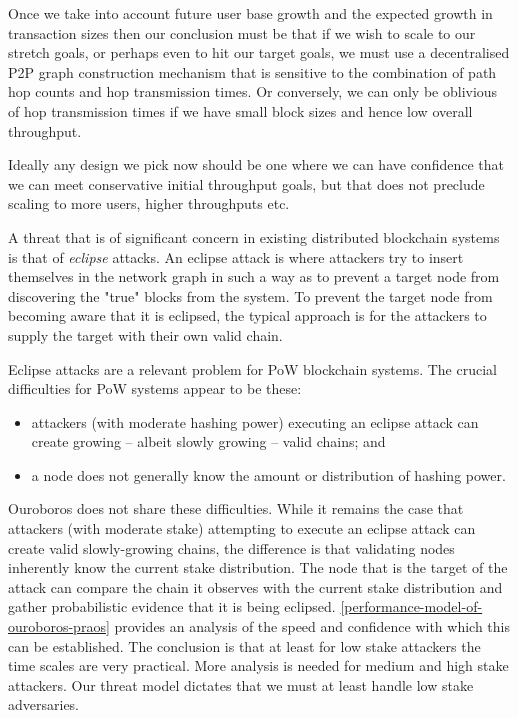 \documentclass[11pt,a4paper]{article}
\begin{document}
Once we take into account future user base growth and the expected
growth in transaction sizes then our conclusion must be that if we wish
to scale to our stretch goals, or perhaps even to hit our target goals,
we must use a decentralised P2P graph construction mechanism that is
sensitive to the combination of path hop counts and hop transmission
times. Or conversely, we can only be oblivious of hop transmission times
if we have small block sizes and hence low overall throughput.

Ideally any design we pick now should be one where we can have
confidence that we can meet conservative initial throughput goals, but
that does not preclude scaling to more users, higher throughputs etc.

A threat that is of significant concern in existing distributed
blockchain systems is that of \emph{eclipse} attacks. An eclipse attack
is where attackers try to insert themselves in the network graph in such
a way as to prevent a target node from discovering the "true" blocks
from the system. To prevent the target node from becoming aware that it
is eclipsed, the typical approach is for the attackers to supply the
target with their own valid chain.

Eclipse attacks are a relevant problem for PoW blockchain systems. The
crucial difficulties for PoW systems appear to be these:

\begin{itemize}
\item
  attackers (with moderate hashing power) executing an eclipse attack
  can create growing -- albeit slowly growing -- valid chains; and
\item
  a node does not generally know the amount or distribution of hashing
  power.
\end{itemize}

Ouroboros does not share these difficulties. While it remains the case
that attackers (with moderate stake) attempting to execute an eclipse
attack can create valid slowly-growing chains, the difference is that
validating nodes inherently know the current stake distribution. The
node that is the target of the attack can compare the chain it observes
with the current stake distribution and gather probabilistic evidence
that it is being eclipsed.
\cref{performance-model-of-ouroboros-praos}
provides an analysis of the speed and confidence with which this can be
established. The conclusion is that at least for low stake attackers the
time scales are very practical. More analysis is needed for medium and
high stake attackers. Our threat model dictates that we must at least
handle low stake adversaries.
\end{document}

